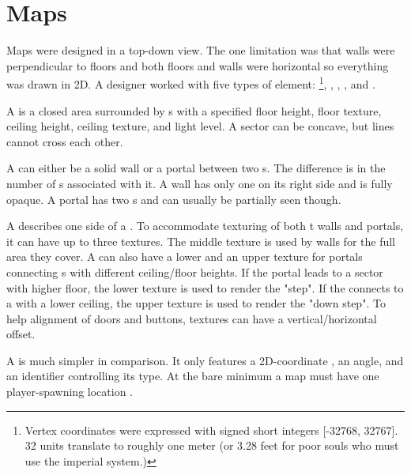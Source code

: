 

\section{Maps}
Maps were designed in a top-down view. The one limitation was that walls were perpendicular to floors and both floors and walls were horizontal so everything was drawn in 2D. A designer worked with five types of element: \footnote{Vertex coordinates were expressed with signed short integers [-32768, 32767]. 32 units translate to roughly one meter (or 3.28 feet for poor souls who must use the imperial system.)}, , , , and .\\
\par
{}

\par
A  is a closed area surrounded by s with a specified floor height, floor texture, ceiling height, ceiling texture, and light level. A sector can be concave, but lines cannot cross each other.\\
\par
A  can either be a solid wall or a portal between two s. The difference is in the number of s associated with it. A wall has only one  on its right side and is fully opaque. A portal has two s and can usually be partially seen though.\\
\par
A  describes one side of a . To accommodate texturing of both t walls and portals, it can have up to three textures. The middle texture is used by walls for the full area they cover. A  can also have a lower and an upper texture for portals connecting s with different ceiling/floor heights. If the portal leads to a sector with higher floor, the lower texture is used to render the "step". If the  connects to a  with a lower ceiling, the upper texture is used to render the "down step". To help alignment of doors and buttons,  textures can have a vertical/horizontal offset. \\
\par
A  is much simpler in comparison. It only features a 2D-coordinate , an angle, and an identifier controlling its type. At the bare minimum a map must have one player-spawning location .\\

